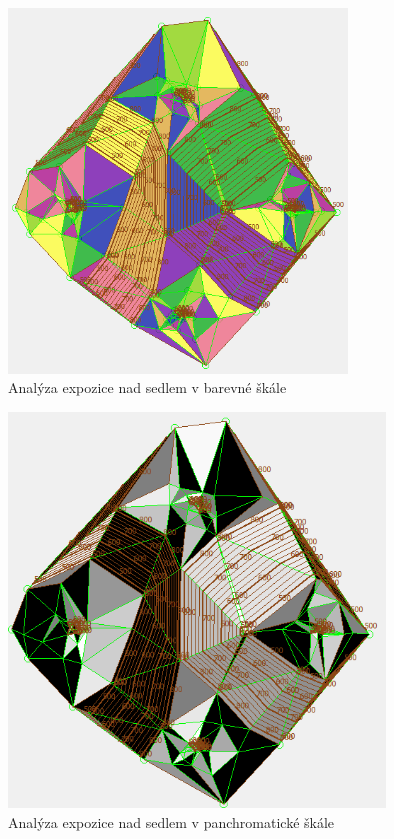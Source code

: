 \documentclass[a4paper,11pt,twoside]{article}
\begin{document}
\vspace{0.2cm}
\begin{figure}[hbt!] 
\begin{center}
\includegraphics[width=9cm]{pictures/saddle_colorful_aspect.PNG} 
\caption[Analýza expozice nad sedlem v barevné škále]{Analýza expozice nad sedlem v barevné škále}
\label{fig:saddle_colorful_aspect}
\end{center}
\end{figure}

\vspace{0.2cm}
\begin{figure}[hbt!] 
\begin{center}
\includegraphics[width=10cm]{pictures/saddle_panchromatic_aspect.PNG} 
\caption[Analýza expozice nad sedlem v panchromatické škále]{Analýza expozice nad sedlem v panchromatické škále}
\label{fig:saddle_panchromatic_aspect}
\end{center}
\end{figure}
\end{document}
